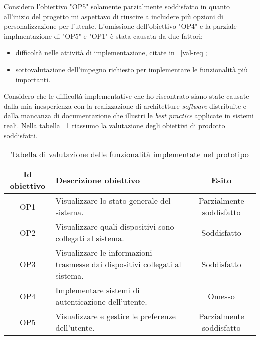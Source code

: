 Considero l'obiettivo "OP5" solamente parzialmente soddisfatto in quanto all'inizio del progetto mi aspettavo di riuscire a includere più opzioni di personalizzazione per l'utente.
L'omissione dell'obiettivo "OP4" e la parziale implmentazione di "OP5" e "OP1" è stata causata da due fattori:
\begin{itemize}
  \item difficoltà nelle attività di implementazione, citate in ~\ref{val-req};
  \item sottovalutazione dell'impegno richiesto per implementare le funzionalità più importanti.
\end{itemize}
Considero che le difficoltà implementative che ho riscontrato siano state causate dalla mia inesperienza con la realizzazione di architetture \emph{software} distribuite e dalla mancanza di documentazione che illustri le \emph{best practice} applicate in sistemi reali.
Nella tabella ~\ref{tab:esito-obiettivi-prodotto} riassumo la valutazione degli obiettivi di prodotto soddisfatti.

\begin{table}[H]
\caption{Tabella di valutazione delle funzionalità implementate nel prototipo}
\label{tab:esito-obiettivi-prodotto}
\begin{tabularx}{\linewidth}{|c|X|c|}
\hline
\textbf{Id obiettivo} & \textbf{Descrizione obiettivo} & \textbf{Esito}\\
\hline
OP1 & Visualizzare lo stato generale del sistema. & Parzialmente soddisfatto \\
\hline
OP2 & Visualizzare quali dispositivi sono collegati al sistema. & Soddisfatto \\
\hline
OP3 & Visualizzare le informazioni trasmesse dai dispositivi collegati al sistema. & Soddisfatto \\
\hline
OP4 & Implementare sistemi di autenticazione dell'utente. & Omesso \\
\hline
OP5 & Visualizzare e gestire le preferenze dell'utente. & Parzialmente soddisfatto \\
\hline
\end{tabularx}
\end{table}

